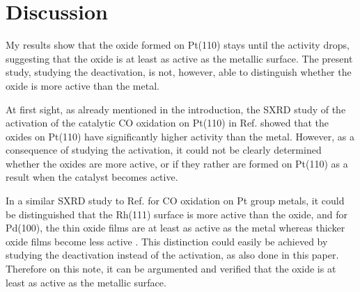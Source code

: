 \documentclass[aps,prl,groupedaddress,twocolumn]{revtex4-1}
\begin{document}
\section{Discussion}
My results show that the oxide formed on Pt(110) stays until the activity drops, suggesting that the oxide is at least as active as the metallic surface. The present study, studying the deactivation, is not, however, able to distinguish whether the oxide is more active than the metal. 

At first sight, as already mentioned in the introduction, the SXRD study of the activation of the catalytic CO oxidation on Pt(110) in Ref.\cite{Ackermann} showed that the oxides on Pt(110) have significantly higher activity than the metal. However, as a consequence of studying the activation, it could not be clearly determined whether the oxides are more active, or if they rather are formed on Pt(110) as a result when the catalyst becomes active. 

In a similar SXRD study to Ref.\cite{Ackermann} for CO oxidation on Pt group metals, it could be distinguished that the Rh(111) surface is more active than the oxide, and for Pd(100), the thin oxide films are at least as active as the metal whereas thicker oxide films become less active \cite{Gustafson}. This distinction could easily be achieved by studying the deactivation instead of the activation, as also done in this paper. Therefore on this note, it can be argumented and verified that the oxide is at least as active as the metallic surface.




\end{document}

